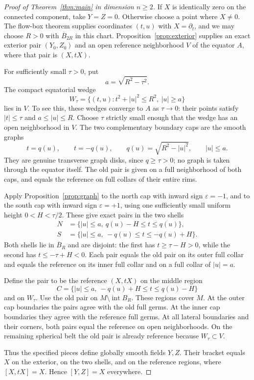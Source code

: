 \documentclass[11pt]{article}
\theoremstyle{remark}
\begin{document}
\begin{proof}[Proof of Theorem~\ref{thm:main} in dimension $n\ge2$]
If $X$ is identically zero on the connected component, take $Y=Z=0$. Otherwise choose a point where $X\ne0$. The flow-box theorem supplies coordinates $(t,u)$ with $X=\partial_t$, and we may choose $R>0$ with $\overline B_{2R}$ in this chart. Proposition~\ref{prop:exterior} supplies an exact exterior pair $(Y_0,Z_0)$ and an open reference neighborhood $V$ of the equator $A$, where that pair is $(X,tX)$.

For sufficiently small $\tau>0$, put
$$
 a=\sqrt{R^2-\tau^2}.
$$
The compact equatorial wedge
$$
 W_\tau=\{(t,u):t^2+|u|^2\le R^2,\ |u|\ge a\}
$$
lies in $V$. To see this, these wedges converge to $A$ as $\tau\to0$: their points satisfy $|t|\le\tau$ and $a\le|u|\le R$. Choose $\tau$ strictly small enough that the wedge has an open neighborhood in $V$. The two complementary boundary caps are the smooth graphs
$$
 t=q(u),\qquad t=-q(u),\qquad
 q(u)=\sqrt{R^2-|u|^2},\qquad |u|\le a.
$$
They are genuine transverse graph disks, since $q\ge\tau>0$; no graph is taken through the equator itself. The old pair is given on a full neighborhood of both caps, and equals the reference on full collars of their entire rims.

Apply Proposition~\ref{prop:graph} to the north cap with inward sign $\varepsilon=-1$, and to the south cap with inward sign $\varepsilon=+1$, using one sufficiently small uniform height $0<H<\tau/2$. These give exact pairs in the two shells
\begin{align*}
    N&=\{|u|\le a,\ q(u)-H\le t\le q(u)\},\\
    S&=\{|u|\le a,\ -q(u)\le t\le-q(u)+H\}.
\end{align*}
Both shells lie in $\overline B_R$ and are disjoint: the first has $t\ge\tau-H>0$, while the second has $t\le-\tau+H<0$. Each pair equals the old pair on its outer full collar and equals the reference on its inner full collar and on a full collar of $|u|=a$.

Define the pair to be the reference $(X,tX)$ on the middle region
$$
 C=\{|u|\le a,\ -q(u)+H\le t\le q(u)-H\}
$$
and on $W_\tau$. Use the old pair on $M\setminus\operatorname{int}B_R$. These regions cover $M$. At the outer cap boundaries the pairs agree with the old full germs. At the inner cap boundaries they agree with the reference full germs. At all lateral boundaries and their corners, both pairs equal the reference on open neighborhoods. On the remaining spherical belt the old pair is already reference because
$W_\tau\subset V$.

Thus the specified pieces define globally smooth fields $Y,Z$. Their bracket equals $X$ on the exterior, on the two shells, and on the reference regions, where $[X,tX]=X$. Hence $[Y,Z]=X$ everywhere.
\end{proof}
\end{document}

